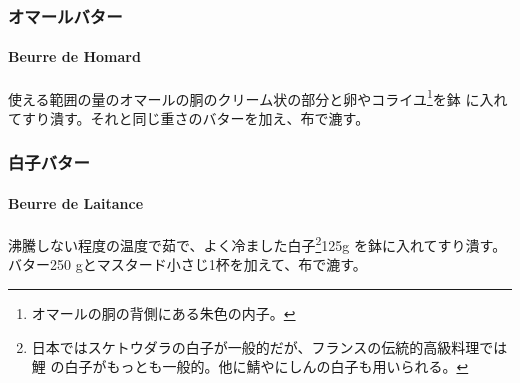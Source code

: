 \begin{recette}
\maeaki

\hypertarget{ux30aaux30deux30fcux30ebux30d0ux30bfux30fc}{%
\subsubsection{オマールバター}\label{ux30aaux30deux30fcux30ebux30d0ux30bfux30fc}}

\hypertarget{beurre-de-homard}{%
\paragraph{Beurre de Homard}\label{beurre-de-homard}}


使える範囲の量のオマールの胴のクリーム状の部分と卵やコライユ\footnote{オマールの胴の背側にある朱色の内子。}を鉢
に入れてすり潰す。それと同じ重さのバターを加え、布で漉す。

\maeaki

\hypertarget{ux767dux5b50ux30d0ux30bfux30fc}{%
\subsubsection{白子バター}\label{ux767dux5b50ux30d0ux30bfux30fc}}

\hypertarget{beurre-de-laitance}{%
\paragraph{Beurre de Laitance}\label{beurre-de-laitance}}


沸騰しない程度の温度で茹で、よく冷ました白子\footnote{日本ではスケトウダラの白子が一般的だが、フランスの伝統的高級料理では鯉
  の白子がもっとも一般的。他に鯖やにしんの白子も用いられる。}125g
を鉢に入れてすり潰す。 バター250
gとマスタード小さじ1杯を加えて、布で漉す。

\maeaki


\end{recette}
